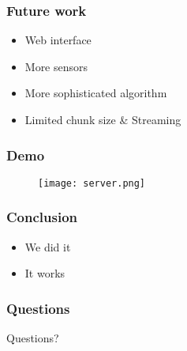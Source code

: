 \begin{frame}
	\frametitle{Future work}
	\begin{itemize}
		\item Web interface
		\item More sensors
		\item More sophisticated algorithm
		\item Limited chunk size \& Streaming
	\end{itemize}
\end{frame}

\begin{frame}
	\frametitle{Demo}
		\begin{figure}[!t]
			\centering
			\texttt{[image: server.png]}
			\label{fig:server}
		\end{figure}
\end{frame}

\begin{frame}
	\frametitle{Conclusion}
	\begin{itemize}
		\item We did it
		\item It works
	\end{itemize}
\end{frame}

\begin{frame}
	\frametitle{Questions}
	\centering
	\LARGE Questions?
\end{frame}